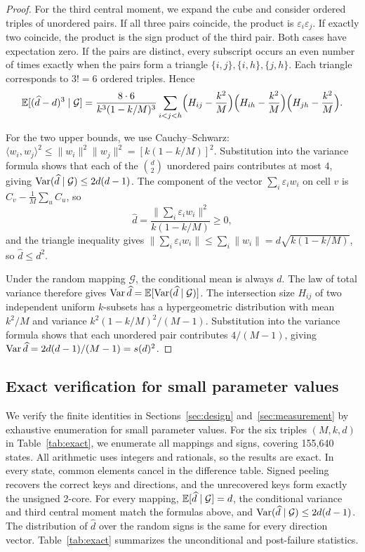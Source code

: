 \begin{proof}
For the third central moment, we expand the cube and consider ordered triples of unordered pairs. If all three pairs coincide, the product is $\varepsilon_i\varepsilon_j$. If exactly two coincide, the product is the sign product of the third pair. Both cases have expectation zero. If the pairs are distinct, every subscript occurs an even number of times exactly when the pairs form a triangle $\{i,j\},\{i,h\},\{j,h\}$. Each triangle corresponds to $3!=6$ ordered triples. Hence
\begin{equation*}
\mathbb E[(\widehat d-d)^3\mid\mathcal G]=\frac{8\cdot6}{k^3(1-k/M)^3}\sum_{i<j<h}\Bigl(H_{ij}-\frac{k^2}{M}\Bigr)\Bigl(H_{ih}-\frac{k^2}{M}\Bigr)\Bigl(H_{jh}-\frac{k^2}{M}\Bigr).
\end{equation*}

For the two upper bounds, we use Cauchy--Schwarz: $\langle w_i,w_j\rangle^2\le\|w_i\|^2\|w_j\|^2=[k(1-k/M)]^2$. Substitution into the variance formula shows that each of the $\binom d2$ unordered pairs contributes at most $4$, giving $\operatorname{Var}(\widehat d\mid\mathcal G)\le2d(d-1)$. The component of the vector $\sum_i\varepsilon_iw_i$ on cell $v$ is $C_v-\frac1M\sum_uC_u$, so
\begin{equation*}
\widehat d=\frac{\|\sum_i\varepsilon_iw_i\|^2}{k(1-k/M)}\ge0,
\end{equation*}
and the triangle inequality gives $\|\sum_i\varepsilon_iw_i\|\le\sum_i\|w_i\|=d\sqrt{k(1-k/M)}$, so $\widehat d\le d^2$.

Under the random mapping $\mathcal G$, the conditional mean is always $d$. The law of total variance therefore gives $\operatorname{Var}\widehat d=\mathbb E[\operatorname{Var}(\widehat d\mid\mathcal G)]$. The intersection size $H_{ij}$ of two independent uniform $k$-subsets has a hypergeometric distribution with mean $k^2/M$ and variance $k^2(1-k/M)^2/(M-1)$. Substitution into the variance formula shows that each unordered pair contributes $4/(M-1)$, giving $\operatorname{Var}\widehat d=2d(d-1)/(M-1)=s(d)^2$.
\end{proof}

\subsection{Exact verification for small parameter values}\label{app:exact}
We verify the finite identities in Sections~\ref{sec:design} and~\ref{sec:measurement} by exhaustive enumeration for small parameter values. For the six triples $(M,k,d)$ in Table~\ref{tab:exact}, we enumerate all mappings and signs, covering 155,640 states. All arithmetic uses integers and rationals, so the results are exact. In every state, common elements cancel in the difference table. Signed peeling recovers the correct keys and directions, and the unrecovered keys form exactly the unsigned 2-core. For every mapping, $\mathbb E[\widehat d\mid\mathcal G]=d$, the conditional variance and third central moment match the formulas above, and $\operatorname{Var}(\widehat d\mid\mathcal G)\le2d(d-1)$. The distribution of $\widehat d$ over the random signs is the same for every direction vector. Table~\ref{tab:exact} summarizes the unconditional and post-failure statistics.

